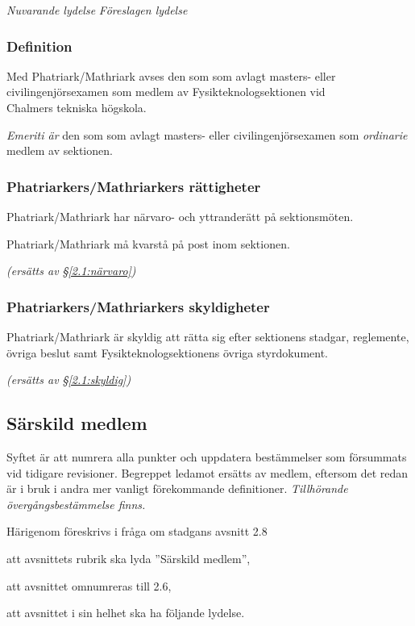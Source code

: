 \documentclass{article}
\newenvironment{lydelse}
    {\begin{paracol}{2}%
        \emph{Nuvarande lydelse}%
        \switchcolumn%
        \emph{Föreslagen lydelse}%
    \end{paracol}%
    \begin{enumerate}[label=\thesubsection.\arabic*]%
    \begin{paracol}{2}%
    }{\end{paracol}\end{enumerate}}
\newcommand{\itemb}{\item[\textbullet]}
\begin{document}
\begin{lydelse}%
    \subsubsection*{Definition}
    \itemb Med Phatriark/Mathriark avses den som som avlagt masters-
  eller civil\-ingenjörs\-examen som medlem av Fysik\-teknolog\-sektionen vid\\
  Ch\-al\-mers tekniska högskola.

\switchcolumn
    \setcounter{enumi}{0}
    \item \emph{Emeriti är} den som som avlagt masters-
  eller civil\-ingenjörs\-examen som \emph{ordinarie} medlem av sektionen.
    
\switchcolumn*
    \subsubsection*{Phatriarkers/Mathriarkers rättigheter}%
    \itemb Phatriark/Mathriark har närvaro- och yttranderätt på sektionsmöten.

    \itemb Phatriark/Mathriark må kvarstå på post inom sektionen.
    
\switchcolumn
    \emph{(ersätts av \S \ref{2.1:närvaro})}

\switchcolumn*
    \subsubsection*{Phatriarkers/Mathriarkers skyldigheter}%
    \itemb Phatriark/Mathriark är skyldig att rätta sig efter sektionens stadgar,
  regle\-mente, övriga beslut samt  Fysikteknologsektionens övriga styrdokument.
    
\switchcolumn
    \emph{(ersätts av \S \ref{2.1:skyldig})}
\end{lydelse}

\subsection{Särskild medlem}
Syftet är att numrera alla punkter och uppdatera bestämmelser som försummats vid tidigare revisioner.
Begreppet ledamot ersätts av medlem, eftersom det redan är i bruk i andra mer vanligt förekommande definitioner.
\emph{Tillhörande övergångsbestämmelse finns.}

Härigenom föreskrivs i fråga om stadgans avsnitt 2.8
\begin{dels}
    \item att avsnittets rubrik ska lyda ''Särskild medlem'',
    \item att avsnittet omnumreras till 2.6,
    \item att avsnittet i sin helhet ska ha följande lydelse.
\end{dels}
\end{document}
